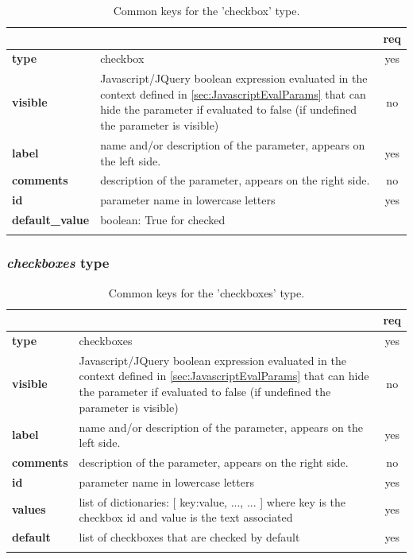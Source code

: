 \begin{longtable}{|>{\bf}L{\linewidth}|L{\linewidth}|c|}
\hline
      &  & {\bf req} 
\tabularnewline \hline \hline
 type  & checkbox  & yes \\ \hline
 visible  & Javascript/JQuery boolean expression evaluated in the context defined 
              in \ref{sec:JavascriptEvalParams} that can hide the parameter if
            evaluated to false (if undefined the parameter is visible)& no \\ \hline
 label  & name and/or description of the parameter, appears on the left side. & yes
                      \\ \hline
 comments & description of the parameter, appears on the right side. & no
                      \\ \hline
 id         & parameter name in lowercase letters  & yes \\ \hline
 default\_value & boolean: True for checked & \\ \hline
\caption{Common keys for the 'checkbox' type.}
\end{longtable}

\subsubsection{ \emph{checkboxes} type}

\begin{longtable}{|>{\bf}L{\linewidth}|L{\linewidth}|c|}
\hline
      &  & {\bf req} 
\tabularnewline \hline \hline
 type  & checkboxes   & yes \\ \hline
 visible  & Javascript/JQuery boolean expression evaluated in the context defined 
              in \ref{sec:JavascriptEvalParams} that can hide the parameter if
            evaluated to false (if undefined the parameter is visible)& no \\ \hline
 label  & name and/or description of the parameter, appears on the left side. & yes
                      \\ \hline
 comments & description of the parameter, appears on the right side. & no
                      \\ \hline
 id         & parameter name in lowercase letters  & yes \\ \hline
 values     & list of dictionaries: [ {key:value, ...}, ... ]
            where key is the checkbox id and value is the text associated
            & yes \\ \hline
 default     & list of checkboxes that are checked by default  & yes \\ \hline
\caption{Common keys for the 'checkboxes' type.}
\end{longtable}


